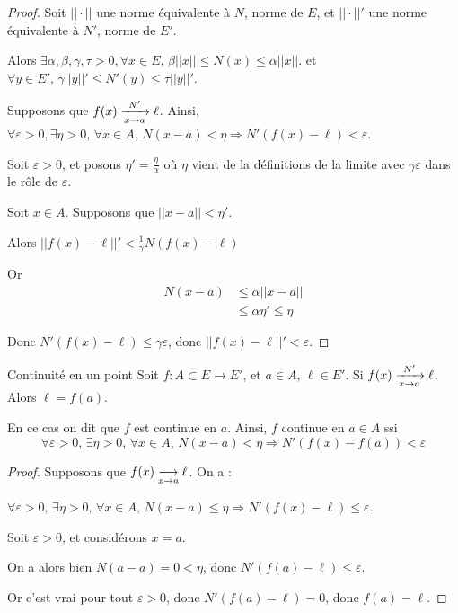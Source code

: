 \begin{proof}
    Soit $||\cdot||$ une norme équivalente à $N$, norme de $E$, 
    et $||\cdot||'$ une norme équivalente à $N'$, norme de $E'$.

    Alors $\exists \alpha, \beta, \gamma, \tau > 0, \forall x \in E, \, \beta ||x|| \leqslant N(x) \leqslant \alpha ||x||$.
    et $\forall y \in E', \, \gamma ||y||' \leqslant N'(y) \leqslant \tau ||y||'$.

    Supposons que $f(x) \limitnorme{N'} x a \ell$. Ainsi, $\forall \varepsilon > 0, \exists \eta > 0, \, \forall x \in A, \, N(x - a) < \eta \Rightarrow N'(f(x) - \ell) < \varepsilon$.

    Soit $\varepsilon > 0$, et posons $\eta' = \frac \eta \alpha$ où $\eta$ vient de la 
    définitions de la limite avec $\gamma \varepsilon$ dans le rôle de $\varepsilon$.

    Soit $x \in A$. Supposons que $||x - a|| < \eta'$. 

    Alors $||f(x) - \ell||' < \frac 1 \gamma N(f(x) - \ell)$

    Or \begin{align*}
        N(x - a) & \leqslant \alpha ||x - a|| \\
        & \leqslant \alpha \eta ' \leqslant \eta
    \end{align*}

    Donc $N'(f(x) - \ell) \leqslant \gamma \varepsilon$, donc $||f(x) - \ell||' < \varepsilon$.
\end{proof}

\begin{theoreme}{Continuité en un point}{}
    Soit $f : A \subset E \to E'$, et $a \in A$, $\ell \in E'$. 
    Si $f(x) \limitnorme{N'}{x}{a} \ell$. Alors $\ell = f(a)$.

    En ce cas on dit que $f$ est continue en $a$. Ainsi, $f$ continue en $a \in A$ ssi 
    \[\forall \varepsilon > 0, \, \exists \eta > 0, \, \forall x \in A, \, N(x - a) < \eta \Rightarrow N'(f(x) - f(a)) < \varepsilon\]
\end{theoreme}

\begin{proof}
    Supposons que $f(x) \limit x a \ell$. On a : 

    $\forall \varepsilon > 0, \, \exists \eta > 0, \, \forall x \in A, \, N(x - a) \leqslant \eta \Rightarrow N'(f(x) - \ell) \leqslant \varepsilon$.

    Soit $\varepsilon > 0$, et considérons $x = a$.

    On a alors bien $N(a - a) = 0 < \eta$, donc $N'(f(a) - \ell) \leqslant \varepsilon$.

    Or c'est vrai pour tout $\varepsilon > 0$, donc $N'(f(a) - \ell) = 0$, donc $f(a) = \ell$.
\end{proof}

